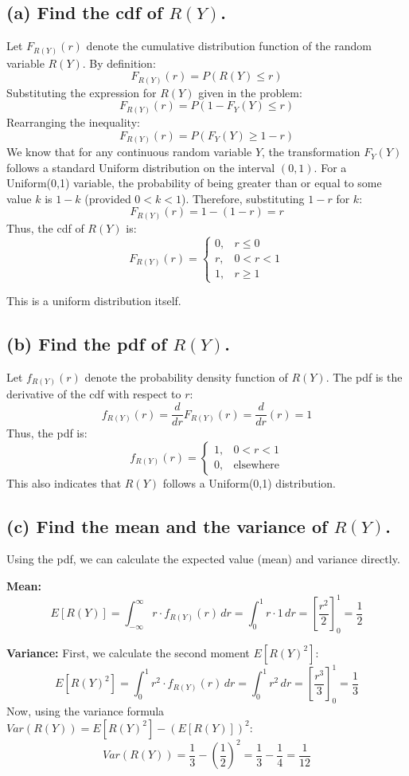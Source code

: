 \documentclass[12pt]{article}
\begin{document}
\subsection*{(a) Find the cdf of $R(Y)$.}
Let $F_{R(Y)}(r)$ denote the cumulative distribution function of the random variable $R(Y)$. By definition:
\[ F_{R(Y)}(r) = P(R(Y) \le r) \]
Substituting the expression for $R(Y)$ given in the problem:
\[ F_{R(Y)}(r) = P(1 - F_Y(Y) \le r) \]
Rearranging the inequality:
\[ F_{R(Y)}(r) = P(F_Y(Y) \ge 1 - r) \]
We know that for any continuous random variable $Y$, the transformation $F_Y(Y)$ follows a standard Uniform distribution on the interval $(0, 1)$. 
For a Uniform(0,1) variable, the probability of being greater than or equal to some value $k$ is $1 - k$ (provided $0 < k < 1$).
Therefore, substituting $1-r$ for $k$:
\[ F_{R(Y)}(r) = 1 - (1 - r) = r \]
Thus, the cdf of $R(Y)$ is:
\[ F_{R(Y)}(r) = \begin{cases} 0, & r \le 0 \\ r, & 0 < r < 1 \\ 1, & r \ge 1 \end{cases} \]

\noindent This is a uniform distribution itself.

\subsection*{(b) Find the pdf of $R(Y)$.}
Let $f_{R(Y)}(r)$ denote the probability density function of $R(Y)$. The pdf is the derivative of the cdf with respect to $r$: 
\[ f_{R(Y)}(r) = \frac{d}{dr} F_{R(Y)}(r) = \frac{d}{dr}(r) = 1 \]
Thus, the pdf is:
\[ f_{R(Y)}(r) = \begin{cases} 1, & 0 < r < 1 \\ 0, & \text{elsewhere} \end{cases} \]
This also indicates that $R(Y)$ follows a Uniform(0,1) distribution.

\subsection*{(c) Find the mean and the variance of $R(Y)$.}
Using the pdf, we can calculate the expected value (mean) and variance directly.

\noindent \textbf{Mean:}
\[ E[R(Y)] = \int_{-\infty}^{\infty} r \cdot f_{R(Y)}(r) \, dr = \int_0^1 r \cdot 1 \, dr = \left[ \frac{r^2}{2} \right]_0^1 = \frac{1}{2} \]

\noindent \textbf{Variance:}
First, we calculate the second moment $E[R(Y)^2]$:
\[ E[R(Y)^2] = \int_0^1 r^2 \cdot f_{R(Y)}(r) \, dr = \int_0^1 r^2 \, dr = \left[ \frac{r^3}{3} \right]_0^1 = \frac{1}{3} \]
Now, using the variance formula $Var(R(Y)) = E[R(Y)^2] - (E[R(Y)])^2$:
\[ Var(R(Y)) = \frac{1}{3} - \left(\frac{1}{2}\right)^2 = \frac{1}{3} - \frac{1}{4} = \frac{1}{12} \]
\end{document}
